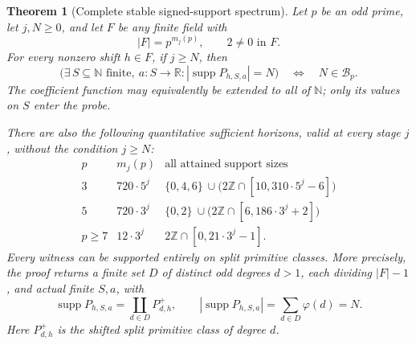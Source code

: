 \documentclass[11pt]{article}
\newtheorem{theorem}{Theorem}[section]
\begin{document}
\begin{theorem}[Complete stable signed-support spectrum]
\label{thm:odd-pell-stable-spectrum}
Let \(p\) be an odd prime, let \(j,N\ge0\), and let \(F\) be any finite
field with
\[
            |F|=p^{m_j(p)},\qquad 2\ne0\text{ in }F.
\]
For every nonzero shift \(h\in F\), if \(j\ge N\), then
\[
 \bigl(\exists\,S\subseteq\mathbb N\text{ finite},\
            a:S\to\mathbb R:
            |\operatorname{supp}P_{h,S,a}|=N\bigr)
          \quad\Longleftrightarrow\quad N\in\mathcal B_p.
\]
The coefficient function may equivalently be extended to all of
\(\mathbb N\); only its values on \(S\) enter the probe.

There are also the following quantitative sufficient horizons, valid
at every stage \(j\), without the condition \(j\ge N\):
\[
\begin{array}{c|c|c}
 p&m_j(p)&\text{all attained support sizes}\\ \hline
 3&720\cdot5^j&
      \{0,4,6\}\ \cup\bigl(2\mathbb Z\cap[10,310\cdot5^j-6]\bigr)\\
 5&720\cdot3^j&
      \{0,2\}\ \cup\bigl(2\mathbb Z\cap[6,186\cdot3^j+2]\bigr)\\
 p\ge7&12\cdot3^j&
      2\mathbb Z\cap[0,21\cdot3^j-1].
\end{array}
\]
Every witness can be supported entirely on split primitive classes.
More precisely, the proof returns a finite set \(D\) of distinct odd
degrees \(d>1\), each dividing \(|F|-1\), and actual finite \(S,a\), with
\[
 \operatorname{supp}P_{h,S,a}
       =\coprod_{d\in D}P^+_{d,h},
       \qquad
 |\operatorname{supp}P_{h,S,a}|=\sum_{d\in D}\varphi(d)=N.
\]
Here \(P^+_{d,h}\) is the shifted split primitive class of degree \(d\).
\end{theorem}
\end{document}

